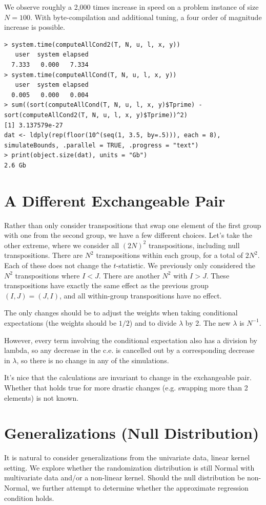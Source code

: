 We observe roughly a 2,000 times increase in speed on a problem instance of size $N=100$.  With
byte-compilation and additional tuning, a four order of magnitude increase is possible.  
\begin{verbatim}
> system.time(computeAllCond2(T, N, u, l, x, y))
   user  system elapsed 
  7.333   0.000   7.334 
> system.time(computeAllCond(T, N, u, l, x, y))
   user  system elapsed 
  0.005   0.000   0.004 
> sum((sort(computeAllCond(T, N, u, l, x, y)$Tprime) - sort(computeAllCond2(T, N, u, l, x, y)$Tprime))^2)
[1] 3.137579e-27
dat <- ldply(rep(floor(10^(seq(1, 3.5, by=.5))), each = 8),
simulateBounds, .parallel = TRUE, .progress = "text")
> print(object.size(dat), units = "Gb")
2.6 Gb
\end{verbatim}

\section{A Different Exchangeable Pair}
Rather than only consider transpositions that swap one element of the
first group with one from the second group, we have a few different
choices.  Let's take the other extreme, where we consider all $(2N)^2$
transpositions, including null transpositions.  There are $N^2$
transpositions within each group, for a total of $2N^2$.  Each of
these does not change the $t$-statistic.  We previously only
considered the $N^2$ transpositions where $I < J$.  There are another
$N^2$ with $I > J$.  These transpositions have exactly the same effect
as the previous group $(I, J) = (J, I)$, and all within-group
transpositions have no effect.  

The only changes should be to adjust the weights when taking
conditional expectations (the weights should be $1/2$) and to divide
$\lambda$ by 2.  The new $\lambda$ is $N^{-1}$.

However, every term involving the conditional expectation also has a
division by lambda, so any decrease in the c.e. is cancelled out by a
corresponding decrease in $\lambda$, so there is no change in any of
the simulations.

It's nice that the calculations are invariant to change in the
exchangeable pair.  Whether that holds true for more drastic changes
(e.g. swapping more than 2 elements) is not known.

\section{Generalizations (Null Distribution)}
It is natural to consider generalizations from the univariate data, linear
kernel setting.  We explore whether the randomization distribution is
still Normal with multivariate data and/or a non-linear kernel.
Should the null distribution be non-Normal, we further attempt to determine
whether the approximate regression condition holds.  

